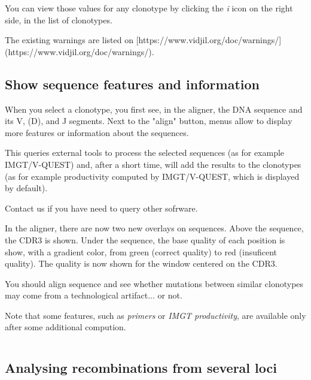 You can view those values for any clonotype by clicking the \textit{i} icon on the
right side, in the list of clonotypes.

The existing warnings are listed on [https://www.vidjil.org/doc/warnings/](https://www.vidjil.org/doc/warnings/).

\subsection{Show sequence features and information}

When you select a clonotype, you first see, in the aligner, the DNA sequence and its V, (D), and J segments.
Next to the "align" button, menus allow to display more features or information about the sequences.
 


This queries external tools to process the selected sequences (as for example IMGT/V-QUEST)
and, after a short time, will add the results to the clonotypes (as for example productivity computed by IMGT/V-QUEST, which is displayed by default).

Contact us if you have need to query other sofrware.



In the aligner, there are now two new overlays on sequences. 
Above the sequence, the CDR3 is shown.
Under the sequence, the base quality of each position is show, with a gradient color, from green (correct quality) to red (insuficent quality). The quality is now shown for the window centered on the CDR3.

You should align sequence and see whether mutations between similar clonotypes may come from a technological artifact... or not.


Note that some features, such as \textit{primers} or \textit{IMGT productivity}, are available only after some additional compution.



\begin{verbatim}
\end{verbatim}

\subsection{Analysing recombinations from several loci}

